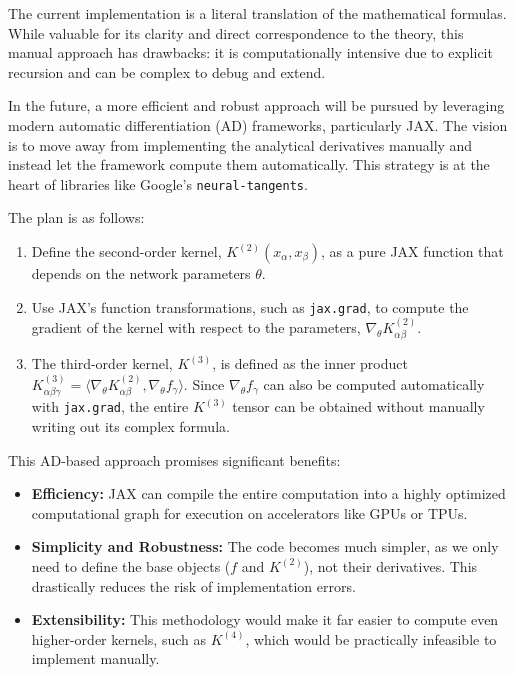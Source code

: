 \documentclass[a4paper]{article}
\begin{document}
The current implementation is a literal translation of the mathematical formulas. While valuable for its clarity and direct correspondence to the theory, this manual approach has drawbacks: it is computationally intensive due to explicit recursion and can be complex to debug and extend.

In the future, a more efficient and robust approach will be pursued by leveraging modern automatic differentiation (AD) frameworks, particularly JAX. The vision is to move away from implementing the analytical derivatives manually and instead let the framework compute them automatically. This strategy is at the heart of libraries like Google's \texttt{neural-tangents}.

The plan is as follows:
\begin{enumerate}
    \item Define the second-order kernel, $K^{(2)}(x_\alpha, x_\beta)$, as a pure JAX function that depends on the network parameters $\theta$.
    \item Use JAX's function transformations, such as \texttt{jax.grad}, to compute the gradient of the kernel with respect to the parameters, $\nabla_\theta K^{(2)}_{\alpha\beta}$.
    \item The third-order kernel, $K^{(3)}$, is defined as the inner product $K^{(3)}_{\alpha\beta\gamma} = \langle \nabla_\theta K^{(2)}_{\alpha\beta}, \nabla_\theta f_\gamma \rangle$. Since $\nabla_\theta f_\gamma$ can also be computed automatically with \texttt{jax.grad}, the entire $K^{(3)}$ tensor can be obtained without manually writing out its complex formula.
\end{enumerate}

This AD-based approach promises significant benefits:
\begin{itemize}
    \item \textbf{Efficiency:} JAX can compile the entire computation into a highly optimized computational graph for execution on accelerators like GPUs or TPUs.
    \item \textbf{Simplicity and Robustness:} The code becomes much simpler, as we only need to define the base objects ($f$ and $K^{(2)}$), not their derivatives. This drastically reduces the risk of implementation errors.
    \item \textbf{Extensibility:} This methodology would make it far easier to compute even higher-order kernels, such as $K^{(4)}$, which would be practically infeasible to implement manually.
\end{itemize}
\end{document}
